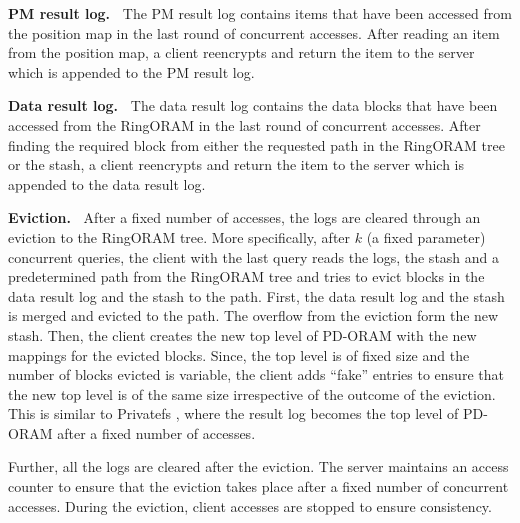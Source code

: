 {\bf PM result log.~}
%
The PM result log contains items that have been accessed from the position map 
in the last round of concurrent accesses. After reading an item from the 
position map, a client reencrypts and return the item to the server which is appended to the PM 
result log. 

{\bf Data result log.~}
%
The data result log contains the data blocks that have been accessed from the 
RingORAM in the last round of concurrent accesses. After finding the required block from either 
the requested path in the RingORAM tree or the stash, 
a client reencrypts and return the item to the server which is appended to the data 
result log.


{\bf Eviction.~}
After a fixed number of accesses, the logs are cleared through an eviction to the 
RingORAM tree. More specifically, after $k$ (a fixed parameter) concurrent queries,  
the client with the last query reads the logs, the stash and a predetermined path 
from the RingORAM tree and tries to evict blocks in the data result log and the stash 
to the path. First, the data result log and the stash is merged and evicted to the path. 
The overflow from the eviction form the new stash. Then, the client creates the new top level 
of PD-ORAM with the new mappings for the evicted blocks. Since, the top level is of fixed size and 
the number of blocks evicted is variable, the client adds ``fake'' entries to ensure that the new top level is 
of the same size irrespective of the outcome of the eviction.  This is similar to Privatefs \cite{privatefs}, 
where the result log becomes the top level of PD-ORAM after a fixed number of accesses. 

Further, all the logs are cleared after the eviction. The server maintains an access counter 
to ensure that the eviction takes place after a fixed number of concurrent accesses. During the eviction, 
client accesses are stopped to ensure consistency. 

